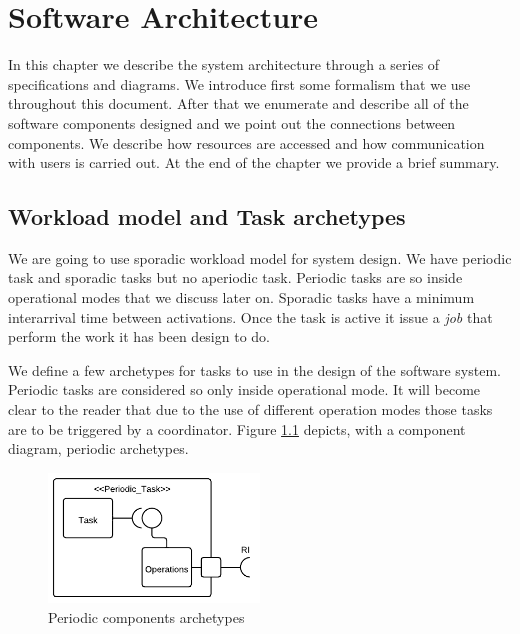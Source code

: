 \documentclass[10pt,a4paper]{report}
\begin{document}
\chapter{Software Architecture}
In this chapter we describe the system architecture through a series of 
specifications and diagrams. We introduce first some formalism that
we use throughout this document. After that we enumerate and describe 
all of the software components designed and we point out the connections 
between components. We describe how resources are accessed and how 
communication with users is carried out. At the end of the chapter we provide a 
brief summary.

\section{Workload model and Task archetypes}
We are going to use sporadic workload model for system design. We have periodic
task and sporadic tasks but no aperiodic task. Periodic tasks are so inside 
operational modes that we discuss later on. Sporadic tasks have a minimum 
interarrival time between activations. Once the task is active it issue a 
\emph{job} that perform the work it has been design to do. 

We define a few archetypes for tasks to use in the design of the software 
system. Periodic tasks are considered so only inside operational mode. It will 
become clear to the reader that due to the use of different operation modes 
those tasks are to be triggered by a coordinator. Figure \ref{periodicarch} 
depicts, with a component diagram, periodic archetypes. 
\begin{figure}[htb]
\includegraphics[width=0.5\textwidth]{diagrams/Periodic_Components}
\centering
\caption{Periodic components archetypes}
\label{periodicarch}
\end{figure}    
\end{document}
